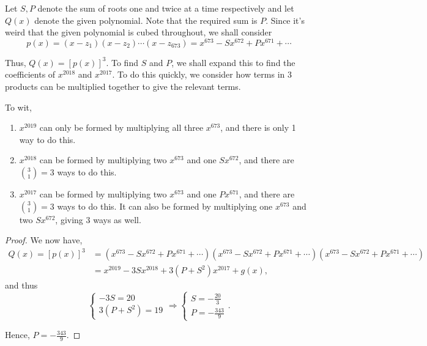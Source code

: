 \documentclass[../main.tex]{subfiles}
\begin{document}
Let $S, P$ denote the sum of roots one and twice at a time respectively and let $Q(x)$ denote the given polynomial. Note that the required sum is $P$. Since it's weird that the given polynomial is cubed throughout, we shall consider
$$p(x)=(x-z_1)(x-z_2)\cdots(x-z_{673})=x^{673}-Sx^{672}+Px^{671}+\cdots$$

Thus, $Q(x)=[p(x)]^3$. To find $S$ and $P$, we shall expand this to find the coefficients of $x^{2018}$ and $x^{2017}$. To do this quickly, we consider how terms in 3 products can be multiplied together to give the relevant terms.

To wit, 
\begin{enumerate}
    \item $x^{2019}$ can only be formed by multiplying all three $x^{673}$, and there is only 1 way to do this.
    \item $x^{2018}$ can be formed by multiplying two $x^{673}$ and one $Sx^{672}$, and there are $\binom{3}{1}=3$ ways to do this.
    \item $x^{2017}$ can be formed by multiplying two $x^{673}$ and one $Px^{671}$, and there are $\binom{3}{1}=3$ ways to do this. It can also be formed by multiplying one $x^{673}$ and two $Sx^{672}$, giving $3$ ways as well.
\end{enumerate}
\begin{proof}
    We now have,
\begin{align*}
    Q(x)=[p(x)]^3&=(x^{673}-Sx^{672}+Px^{671}+\cdots)(x^{673}-Sx^{672}+Px^{671}+\cdots)(x^{673}-Sx^{672}+Px^{671}+\cdots) \\
    &= x^{2019}-3Sx^{2018}+3(P+S^2)x^{2017}+g(x),
\end{align*}
and thus
$$\begin{cases} -3S=20 \\ 3(P+S^2)=19 \end{cases}\Rightarrow \begin{cases} S=-\frac{20}{3} \\ P=-\frac{343}{9}\end{cases}.$$

Hence, $\boxed{P=-\frac{343}{9}}$.
\end{proof}
\end{document}
